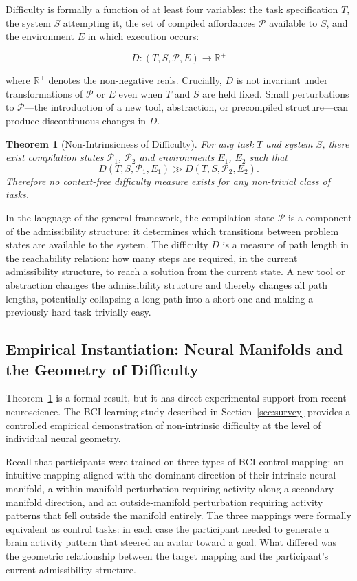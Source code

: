 \documentclass[12pt, a4paper]{article}
\theoremstyle{plain}
\newtheorem{theorem}{Theorem}[section]
\theoremstyle{definition}
\theoremstyle{remark}
\begin{document}
Difficulty is formally a function of at least four variables: the task
specification $T$, the system $S$ attempting it, the set of compiled
affordances $\mathcal{P}$ available to $S$, and the environment $E$ in
which execution occurs:

$$D: (T, S, \mathcal{P}, E) \longrightarrow \mathbb{R}^+$$

where $\mathbb{R}^+$ denotes the non-negative reals. Crucially, $D$ is not
invariant under transformations of $\mathcal{P}$ or $E$ even when $T$ and
$S$ are held fixed. Small perturbations to $\mathcal{P}$---the introduction
of a new tool, abstraction, or precompiled structure---can produce
discontinuous changes in $D$.

\begin{theorem}[Non-Intrinsicness of Difficulty]
\label{thm:difficulty}
For any task $T$ and system $S$, there exist compilation states $\mathcal{P}_1$,
$\mathcal{P}_2$ and environments $E_1$, $E_2$ such that
$$D(T, S, \mathcal{P}_1, E_1) \gg D(T, S, \mathcal{P}_2, E_2).$$
Therefore no context-free difficulty measure exists for any non-trivial
class of tasks.
\end{theorem}

In the language of the general framework, the compilation state $\mathcal{P}$
is a component of the admissibility structure: it determines which transitions
between problem states are available to the system. The difficulty $D$ is a
measure of path length in the reachability relation: how many steps are
required, in the current admissibility structure, to reach a solution from
the current state. A new tool or abstraction changes the admissibility
structure and thereby changes all path lengths, potentially collapsing a
long path into a short one and making a previously hard task trivially easy.

\subsection{Empirical Instantiation: Neural Manifolds and the Geometry of Difficulty}

Theorem~\ref{thm:difficulty} is a formal result, but it has direct
experimental support from recent neuroscience. The BCI learning study
described in Section~\ref{sec:survey} \citep{busch2026} provides a
controlled empirical demonstration of non-intrinsic difficulty at the
level of individual neural geometry.

Recall that participants were trained on three types of BCI control
mapping: an intuitive mapping aligned with the dominant direction of
their intrinsic neural manifold, a within-manifold perturbation requiring
activity along a secondary manifold direction, and an outside-manifold
perturbation requiring activity patterns that fell outside the manifold
entirely. The three mappings were formally equivalent as control tasks:
in each case the participant needed to generate a brain activity pattern
that steered an avatar toward a goal. What differed was the geometric
relationship between the target mapping and the participant's current
admissibility structure.
\end{document}

